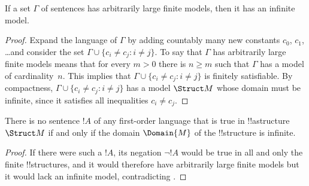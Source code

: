 \documentclass[../../../include/open-logic-section]{subfiles}
\begin{document}

\begin{thm}
 If a set $\Gamma$ of sentences has arbitrarily
large finite models, then it has an infinite model.
\end{thm}

\begin{proof}
Expand the language of $\Gamma$ by adding countably many new constants
$c_0$, $c_1$, \dots and consider the set $\Gamma \cup \{c_i \neq c_j :
i \neq j\}$. To say that $\Gamma$ has arbitrarily large finite models
means that for every $m >0$ there is $n\ge m$ such that $\Gamma$ has a
model of cardinality~$n$. This implies that $\Gamma \cup \{c_i \neq
c_j : i \neq j\}$ is finitely satisfiable. By compactness, $\Gamma
\cup \{c_i \neq c_j : i \neq j\}$ has a model $\Struct M$ whose domain
must be infinite, since it satisfies all inequalities $c_i \neq c_j$.
\end{proof}

\begin{prop}
There is no sentence $!A$ of any first-order language that is true in
!!a{structure}~$\Struct M$ if and only if the domain $\Domain{M}$ of
the !!{structure} is infinite.
\end{prop}

\begin{proof}
If there were such a $!A$, its negation $\lnot !A$ would be true in
all and only the finite !!{structure}s, and it would therefore have
arbitrarily large finite models but it would lack an infinite model,
contradicting .
\end{proof}
\end{document}
